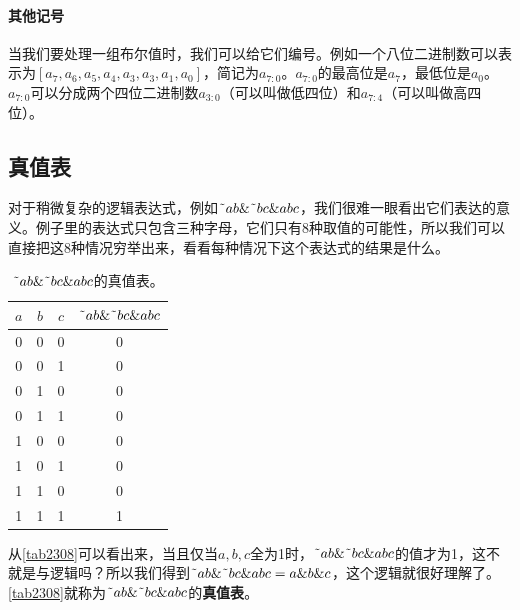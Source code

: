 \paragraph*{其他记号}
当我们要处理一组布尔值时，我们可以给它们编号。例如一个八位二进制数可以表示为$[a_7,a_6,a_5,a_4,a_3,a_3,a_1,a_0]$，简记为$a_{7:0}$。$a_{7:0}$的最高位是$a_7$，最低位是$a_0$。$a_{7:0}$可以分成两个四位二进制数$a_{3:0}$（可以叫做低四位）和$a_{7:4}$（可以叫做高四位）。

\subsection{真值表}
对于稍微复杂的逻辑表达式，例如$\textrm{\~{}}ab\&\textrm{\~{}}bc\&abc$，我们很难一眼看出它们表达的意义。例子里的表达式只包含三种字母，它们只有8种取值的可能性，所以我们可以直接把这8种情况穷举出来，看看每种情况下这个表达式的结果是什么。

\begin{table}[!ht]
  \centering
  \begin{tabular}{|c|c|c||c|}
    \hline
    $a$ & $b$ & $c$ & $\textrm{\~{}}ab\&\textrm{\~{}}bc\&abc$ \\\hline
    0   & 0   & 0   & 0 \\\hline
    0   & 0   & 1   & 0 \\\hline
    0   & 1   & 0   & 0 \\\hline
    0   & 1   & 1   & 0 \\\hline
    1   & 0   & 0   & 0 \\\hline
    1   & 0   & 1   & 0 \\\hline
    1   & 1   & 0   & 0 \\\hline
    1   & 1   & 1   & 1 \\\hline
  \end{tabular}
  \caption{$\textrm{\~{}}ab\&\textrm{\~{}}bc\&abc$的真值表。}\label{tab2308}
\end{table}

从\autoref{tab2308}可以看出来，当且仅当$a,b,c$全为1时，$\textrm{\~{}}ab\&\textrm{\~{}}bc\&abc$的值才为1，这不就是与逻辑吗？所以我们得到$\textrm{\~{}}ab\&\textrm{\~{}}bc\&abc=a\&b\&c$，这个逻辑就很好理解了。\autoref{tab2308}就称为$\textrm{\~{}}ab\&\textrm{\~{}}bc\&abc$的\textbf{真值表}。

